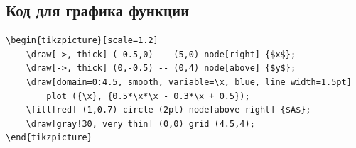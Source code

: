 \documentclass[12pt,a4paper]{article}
\begin{document}
\subsection*{Код для графика функции}

\begin{verbatim}
\begin{tikzpicture}[scale=1.2]
    \draw[->, thick] (-0.5,0) -- (5,0) node[right] {$x$};
    \draw[->, thick] (0,-0.5) -- (0,4) node[above] {$y$};
    \draw[domain=0:4.5, smooth, variable=\x, blue, line width=1.5pt] 
        plot ({\x}, {0.5*\x*\x - 0.3*\x + 0.5});
    \fill[red] (1,0.7) circle (2pt) node[above right] {$A$};
    \draw[gray!30, very thin] (0,0) grid (4.5,4);
\end{tikzpicture}
\end{verbatim}
\end{document}
